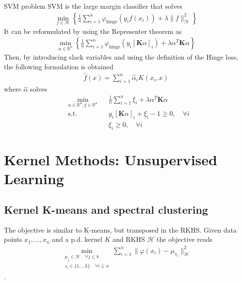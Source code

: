 \documentclass[10pt]{article}
\begin{document}
\begin{Definition}{SVM problem}{}
  SVM is the large margin classifier that solves
  \begin{align*}
    \min_{f\in \mathcal{H}}\left\{ \frac{1}{n}\sum_{i=1}^n 
    \varphi_{\text{hinge}}(y_i f(x_i)) + \lambda \lVert f\rVert_\mathcal{H}^2
    \right\}
  \end{align*}
  It can be reformulated by using the Representer theorem as 
  \begin{align*}
    \min_{\alpha \in \mathbb{R}^n}\left\{ \frac{1}{n}\sum_{i=1}^n 
    \varphi_{\text{hinge}}(y_i [\mathbf{K}\alpha]_i) + \lambda \alpha^T
    \mathbf{K}\alpha \right\}
  \end{align*}
  Then, by introducing slack variables and using the definition of the Hinge 
  loss, the following formulation is obtained 
  \begin{align*}
    \hat{f}(x) = \sum_{i=1}^n \hat{\alpha}_i K(x_i, x)
  \end{align*}
  where $\hat{\alpha}$ solves
  \begin{equation*}
  \begin{aligned}
    &\min_{\alpha \in \mathbb{R}^n,\xi\in \mathbb{R}^n} & & \frac{1}{n}
    \sum_{i=1}^n \xi_i +\lambda \alpha^T \mathbf{K}\alpha \\
    &\text{s.t.} & & y_i [\mathbf{K}\alpha]_i+ \xi_i - 1 \geq 0, \quad 
    \forall i\\
    & & & \xi_i \geq 0 , \quad \forall i
  \end{aligned}
  \end{equation*}
\end{Definition}

\section{Kernel Methods: Unsupervised Learning}

\subsection{Kernel K-means and spectral clustering}

The objective is similar to K-means, but transposed in the RKHS. Given data
points $x_1, ..., x_n$ and a p.d. kernel $K$ and RKHS $\mathcal{H}$ the
objective reads
\begin{align*}
  \min_{\substack{\mu_j \in \mathcal{H} \quad \forall j \leq k \\ s_i \in 
  \{1, ... k\}
  \quad \forall i \leq n}}\sum_{i=1}^n \lVert \varphi(x_i) - \mu_{s_i}
  \rVert^2_\mathcal{H}
\end{align*}.
\end{document}
